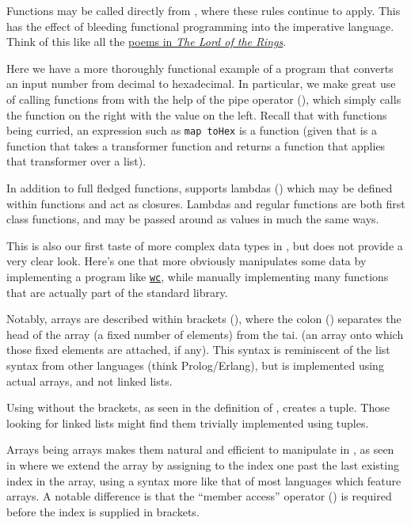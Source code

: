 Functions may be called directly from \Prose{}, where these rules continue to apply.
This has the effect of bleeding functional programming into the imperative language.
Think of this like all the
\href{https://tolkiengateway.net/wiki/Poems_in_The_Lord_of_the_Rings}{poems in \emph{The Lord of the Rings}}.


Here we have a more thoroughly functional example of a program that converts an
input number from decimal to hexadecimal. In particular, we make great use of
calling functions from \Prose{} with the help of the pipe operator (\op{|>}),
which simply calls the function on the right with the value on the left. Recall
that with functions being curried, an expression such as \texttt{map toHex} is a
function (given that  is a function that takes a transformer function and
returns a function that applies that transformer over a list).

In addition to full fledged functions, \Poetry{} supports lambdas () which
may be defined within functions and act as closures. Lambdas and regular functions
are both first class functions, and may be passed around as values in much the same
ways.

This is also our first taste of more complex data types in \Trilogy{}, but does
not provide a very clear look. Here's one that more obviously manipulates some
data by implementing a program like \href{https://ss64.com/bash/wc.html}{\texttt{wc}},
while manually implementing many functions that are actually part of the standard library.


Notably, arrays are described within brackets (\op{[]}), where the colon
(\op{:}) separates the head of the array (a fixed number of elements) from the tai.
(an array onto which those fixed elements are attached, if any). This syntax is
reminiscent of the list syntax from other languages (think Prolog/Erlang), but
is implemented using actual arrays, and not linked lists.

Using \op{:} without the brackets, as seen in the definition of ,
creates a tuple. Those looking for linked lists might find them trivially implemented
using tuples.

Arrays being arrays makes them natural and efficient to manipulate in \Prose{}, as
seen in  where we extend the array by assigning to the index one
past the last existing index in the array, using a syntax more like that of most
languages which feature arrays. A notable difference is that the ``member access''
operator () is required before the index is supplied in brackets.

